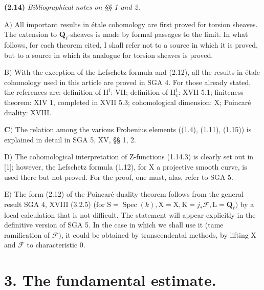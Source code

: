 \documentclass[10pt,leqno]{article}
\begin{document}
\noindent \textbf{(2.14)} \emph{Bibliographical notes on §§ 1 and 2.}\par

\noindent \(\mathrm{A})\) All important results in étale cohomology are first proved for torsion sheaves. The extension to \(\mathbf{Q}_{\ell }\)-sheaves is made by formal passages to the limit. In what follows, for each theorem cited, \(\mathrm{I}\) shall refer not to a source in which it is proved, but to a source in which its analogue for torsion sheaves is proved.\par

\noindent \(\mathrm{B})\) With the exception of the Lefschetz formula and (2.12), all the results in étale cohomology used in this article are proved in SGA 4. For those already stated, the references are: definition of \(\mathrm{H}^{i}\): VII; definition of \(\mathrm{H}_{c}^{i}\): XVII 5.1; finiteness theorem: XIV 1, completed in XVII 5.3; cohomological dimension: \(\mathrm{X}\); Poincaré duality: XVIII.\par

\noindent \(\mathbf{C})\) The relation among the various Frobenius elements ((1.4), (1.11), (1.15)) is explained in detail in SGA 5, XV, §§ 1, 2.\par

\noindent \(\mathrm{D})\) The cohomological interpretation of \(\mathrm{Z}\)-functions (1.14.3) is clearly set out in [1]; however, the Lefschetz formula (1.12), for \(\mathrm{X}\) a projective smooth curve, is used there but not proved. For the proof, one must, alas, refer to SGA 5.\par

\noindent \(\mathrm{E})\) The form (2.12) of the Poincaré duality theorem follows from the general result SGA 4, XVIII (3.2.5) (for \(\mathrm{S}=\operatorname{Spec}(k), \mathrm{X}=\mathrm{X}, \mathrm{K}=j_{*}\mathcal{F} , \mathrm{L}=\mathbf{Q}_{\ell })\) by a local calculation that is not difficult. The statement will appear explicitly in the definitive version of SGA 5. In the case in which we shall use it (tame ramification of \(\mathcal{F} )\), it could be obtained by transcendental methods, by lifting \(\mathrm{X}\) and \(\mathcal{F} \) to characteristic 0.\par

\section*{3. The fundamental estimate.}
\end{document}
